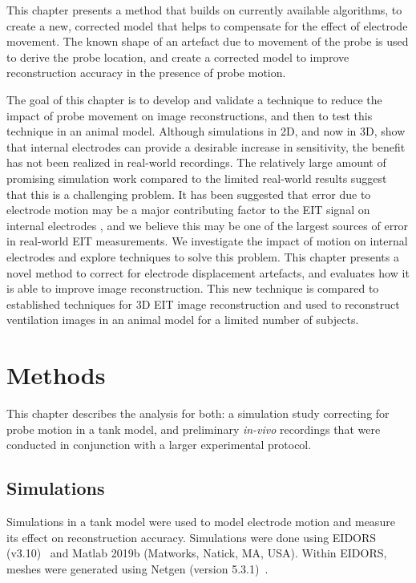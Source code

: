 This chapter presents a method that builds on currently available
algorithms, to create a new, corrected model
that helps to compensate for the effect of electrode movement.  
The known shape of an artefact due to movement of the probe is used to 
derive the probe location, and create a corrected model to improve 
reconstruction accuracy in the presence of probe motion.

The goal of this chapter is to develop and validate a technique to reduce the impact of probe movement on 
image reconstructions, and then to test this technique in an animal model. 
Although simulations in 2D, and now in 3D, show that internal electrodes can provide 
a desirable increase in sensitivity, the benefit has not been realized in real-world
recordings. 
The relatively large amount of promising simulation work compared to the limited real-world 
results suggest that this is a challenging problem. 
It has been suggested that error due to electrode motion may be a major contributing 
factor to the EIT signal on internal electrodes \parencite{nguyen_electrical_2020},
and we believe this may be one of the largest sources of error in real-world 
EIT measurements. 
We investigate the impact of motion on internal electrodes and explore 
techniques to solve this problem.
This chapter presents a novel method to correct for electrode displacement artefacts, and evaluates 
how it is able to improve image reconstruction.
This new technique is compared to 
established techniques for 3D EIT image reconstruction 
and used  to reconstruct ventilation images 
in an animal model for a limited number of subjects.

\section{Methods}
This chapter describes the analysis for both: a simulation study correcting for probe motion 
in a tank model, and preliminary \emph{in-vivo} recordings that were conducted 
in conjunction with a larger experimental protocol. 

\subsection{Simulations}
 Simulations 
in a tank model were used to model electrode motion and measure its effect on reconstruction accuracy.
Simulations were done using EIDORS (v3.10)~\parencite{adler_eidors_2017}
and Matlab 2019b (Matworks, Natick, MA, USA).
Within EIDORS, meshes were generated using 
Netgen (version 5.3.1)~\parencite{schoberl_netgen_1997}.

